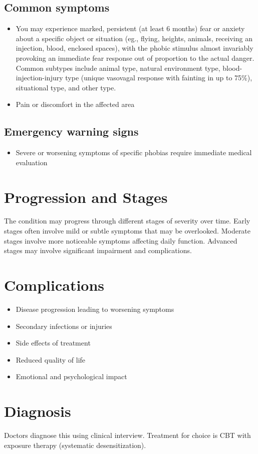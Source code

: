 \subsection{Common symptoms}
\begin{itemize}[noitemsep]
  \item You may experience marked, persistent (at least 6 months) fear or anxiety about a specific object or situation (eg., flying, heights, animals, receiving an injection, blood, enclosed spaces), with the phobic stimulus almost invariably provoking an immediate fear response out of proportion to the actual danger. Common subtypes include animal type, natural environment type, blood-injection-injury type (unique vasovagal response with fainting in up to 75\%), situational type, and other type.
  \item Pain or discomfort in the affected area
  \end{itemize}
\subsection{Emergency warning signs}
\begin{itemize}[noitemsep]
  \item Severe or worsening symptoms of specific phobias require immediate medical evaluation
\end{itemize}
\section{Progression and Stages}
The condition may progress through different stages of severity over time. Early stages often involve mild or subtle symptoms that may be overlooked. Moderate stages involve more noticeable symptoms affecting daily function. Advanced stages may involve significant impairment and complications.
\section{Complications}
\begin{itemize}[noitemsep]
  \item Disease progression leading to worsening symptoms
  \item Secondary infections or injuries
  \item Side effects of treatment
  \item Reduced quality of life
  \item Emotional and psychological impact
\end{itemize}
\section{Diagnosis}
Doctors diagnose this using clinical interview. Treatment for choice is CBT with exposure therapy (systematic desensitization).

